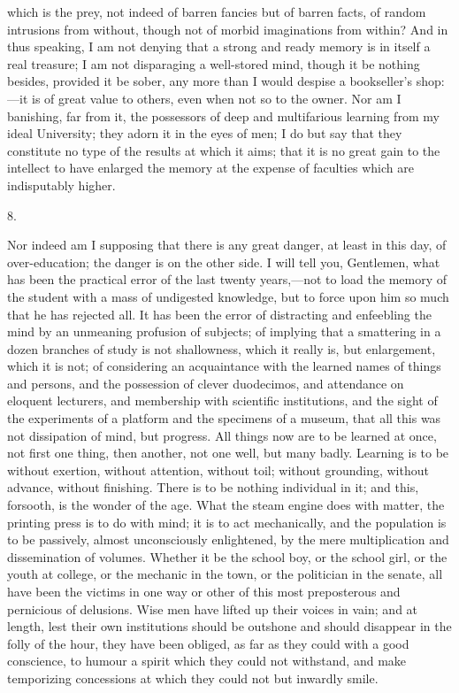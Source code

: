 which is the prey, not indeed of barren fancies but of barren facts,
of random intrusions from without, though not of morbid imaginations
from within? And in thus speaking, I am not denying that a strong and
ready memory is in itself a real treasure; I am not disparaging a
well-stored mind, though it be nothing besides, provided it be
sober, any more than I would despise a bookseller's shop:—it is of
great value to others, even when not so to the owner. Nor am I
banishing, far from it, the possessors of deep and multifarious
learning from my ideal University; they adorn it in the eyes of men; I
do but say that they constitute no type of the results at which it
aims; that it is no great gain to the intellect to have enlarged the
memory at the expense of faculties which are indisputably higher.

8.

Nor indeed am I supposing that there is any great danger, at least
in this day, of over-education; the danger is on the other side. I
will tell you, Gentlemen, what has been the practical error of the
last twenty years,—not to load the memory of the student with a mass
of undigested knowledge, but to force upon him so much that he has
rejected all. It has been the error of distracting and enfeebling the
mind by an unmeaning profusion of subjects; of implying that a
smattering in a dozen branches of study is not shallowness, which it
really is, but enlargement, which it is not; of considering an
acquaintance with the learned names of things and persons, and the
possession of clever duodecimos, and attendance on eloquent lecturers,
and membership with scientific institutions, and the sight of the
experiments of a platform and the specimens of a museum, that all this
was not dissipation of mind, but progress. All things now are to be
learned at once, not first one thing, then another, not one well, but
many badly. Learning is to be without exertion, without attention,
without toil; without grounding, without advance, without finishing.
There is to be nothing individual in it; and this, forsooth, is the
wonder of the age. What the steam engine does with matter, the
printing press is to do with mind; it is to act mechanically, and the
population is to be passively, almost unconsciously enlightened, by
the mere multiplication and dissemination of volumes. Whether it be
the school boy, or the school girl, or the youth at college, or the
mechanic in the town, or the politician in the senate, all have been
the victims in one way or other of this most preposterous and
pernicious of delusions. Wise men have lifted up their voices in vain;
and at length, lest their own institutions should be outshone and
should disappear in the folly of the hour, they have been obliged, as
far as they could with a good conscience, to humour a spirit which
they could not withstand, and make temporizing concessions at which
they could not but inwardly smile.

